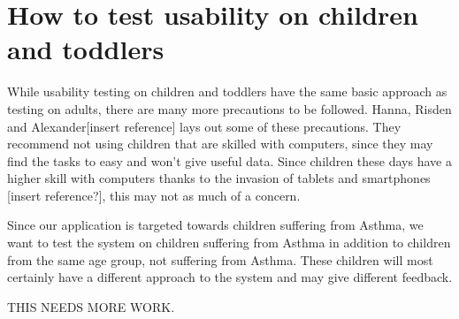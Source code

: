\section{How to test usability on children and toddlers}
While usability testing on children and toddlers have the same basic approach as testing on adults, there are many more precautions to be followed. 
Hanna, Risden and Alexander[insert reference] lays out some of these precautions. They recommend not using children that are skilled with computers, since they may find the tasks to easy and won't give useful data. 
Since children these days have a higher skill with computers thanks to the invasion of tablets and smartphones [insert reference?], this may not as much of a concern. 

Since our application is targeted towards children suffering from Asthma, we want to test the system on children suffering from Asthma in addition to children from the same age group, not suffering from Asthma. These children will most certainly have a different approach to the system and may give different feedback.

THIS NEEDS MORE WORK.